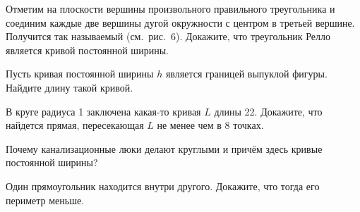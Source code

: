\documentclass[a4paper,10pt]{article}
\begin{document}
Отметим на плоскости вершины произвольного правильного треугольника
и соединим каждые две вершины дугой окружности с центром в третьей
вершине. Получится так называемый 
(см.~рис.~6). Докажите, что треугольник Релло
является кривой постоянной ширины.



Пусть кривая постоянной ширины $h$ является границей выпуклой фигуры.
Найдите длину такой кривой.


В круге радиуса 1 заключена какая-то кривая $L$ длины 22. Докажите, что
найдется прямая, пересекающая $L$ не менее чем в 8 точках.


Почему канализационные люки делают круглыми и причём здесь кривые постоянной ширины?

Один прямоугольник находится внутри другого. Докажите, что тогда его периметр меньше.

\end{document}
